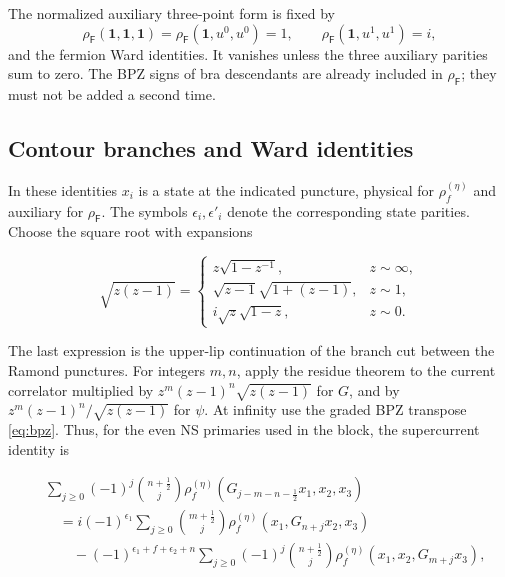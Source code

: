 \documentclass[11pt]{article}
\newcommand{\F}{\mathsf F}
\numberwithin{equation}{section}
\begin{document}
The normalized auxiliary three-point form is fixed by
\begin{equation}
 \rho_{\F}(\mathbf1,\mathbf1,\mathbf1)
 =\rho_{\F}(\mathbf1,u^0,u^0)=1,
 \qquad \rho_{\F}(\mathbf1,u^1,u^1)=i,
 \label{eq:aux-ground}
\end{equation}
and the fermion Ward identities. It vanishes unless the three auxiliary
parities sum to zero. The BPZ signs of bra descendants are already included
in $\rho_{\F}$; they must not be added a second time.

\subsection{Contour branches and Ward identities}

In these identities $x_i$ is a state at the indicated puncture,
physical for $\rho_f^{(\eta)}$ and auxiliary for $\rho_{\F}$. The symbols
$\epsilon_i,\epsilon'_i$ denote the corresponding state parities.
Choose the square root with expansions

\begin{equation}
 \sqrt{z(z-1)}=\begin{cases}
 z\sqrt{1-z^{-1}},&z\sim\infty,\\
 \sqrt{z-1}\sqrt{1+(z-1)},&z\sim1,\\
 i\sqrt z\sqrt{1-z},&z\sim0.
 \end{cases}
\end{equation}

The last expression is the upper-lip continuation of the branch cut
between the Ramond punctures. For integers $m,n$, apply the residue
theorem to the current correlator multiplied by
$z^m(z-1)^n\sqrt{z(z-1)}$ for $G$, and by
$z^m(z-1)^n/\sqrt{z(z-1)}$ for $\psi$.
At infinity use the graded BPZ transpose \eqref{eq:bpz}. Thus, for
the even NS primaries used in the block, the supercurrent identity is

\begin{equation}
\begin{aligned}
 &\sum_{j\ge0}(-1)^j\binom{n+\frac12}{j}
 \rho_f^{(\eta)}(G_{j-m-n-\frac12}x_1,x_2,x_3)\\
 &\quad=i(-1)^{\epsilon_1}\sum_{j\ge0}\binom{m+\frac12}{j}
 \rho_f^{(\eta)}(x_1,G_{n+j}x_2,x_3)\\
 &\qquad-(-1)^{\epsilon_1+f+\epsilon_2+n}
       \sum_{j\ge0}(-1)^j\binom{n+\frac12}{j}
 \rho_f^{(\eta)}(x_1,x_2,G_{m+j}x_3),
\end{aligned}
\end{equation}
\end{document}
